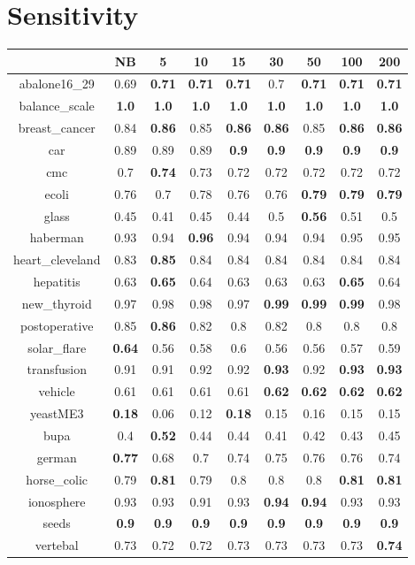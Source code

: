 \documentclass{article}%
\begin{document}
%
\section*{Sensitivity}%
\begin{tabular}{c|cccccccc}%
\hline%
&NB&5&10&15&30&50&100&200\\%
\hline%
abalone16\_29&0.69&\textbf{0.71}&\textbf{0.71}&\textbf{0.71}&0.7&\textbf{0.71}&\textbf{0.71}&\textbf{0.71}\\%
\hline%
balance\_scale&\textbf{1.0}&\textbf{1.0}&\textbf{1.0}&\textbf{1.0}&\textbf{1.0}&\textbf{1.0}&\textbf{1.0}&\textbf{1.0}\\%
\hline%
breast\_cancer&0.84&\textbf{0.86}&0.85&\textbf{0.86}&\textbf{0.86}&0.85&\textbf{0.86}&\textbf{0.86}\\%
\hline%
car&0.89&0.89&0.89&\textbf{0.9}&\textbf{0.9}&\textbf{0.9}&\textbf{0.9}&\textbf{0.9}\\%
\hline%
cmc&0.7&\textbf{0.74}&0.73&0.72&0.72&0.72&0.72&0.72\\%
\hline%
ecoli&0.76&0.7&0.78&0.76&0.76&\textbf{0.79}&\textbf{0.79}&\textbf{0.79}\\%
\hline%
glass&0.45&0.41&0.45&0.44&0.5&\textbf{0.56}&0.51&0.5\\%
\hline%
haberman&0.93&0.94&\textbf{0.96}&0.94&0.94&0.94&0.95&0.95\\%
\hline%
heart\_cleveland&0.83&\textbf{0.85}&0.84&0.84&0.84&0.84&0.84&0.84\\%
\hline%
hepatitis&0.63&\textbf{0.65}&0.64&0.63&0.63&0.63&\textbf{0.65}&0.64\\%
\hline%
new\_thyroid&0.97&0.98&0.98&0.97&\textbf{0.99}&\textbf{0.99}&\textbf{0.99}&0.98\\%
\hline%
postoperative&0.85&\textbf{0.86}&0.82&0.8&0.82&0.8&0.8&0.8\\%
\hline%
solar\_flare&\textbf{0.64}&0.56&0.58&0.6&0.56&0.56&0.57&0.59\\%
\hline%
transfusion&0.91&0.91&0.92&0.92&\textbf{0.93}&0.92&\textbf{0.93}&\textbf{0.93}\\%
\hline%
vehicle&0.61&0.61&0.61&0.61&\textbf{0.62}&\textbf{0.62}&\textbf{0.62}&\textbf{0.62}\\%
\hline%
yeastME3&\textbf{0.18}&0.06&0.12&\textbf{0.18}&0.15&0.16&0.15&0.15\\%
\hline%
bupa&0.4&\textbf{0.52}&0.44&0.44&0.41&0.42&0.43&0.45\\%
\hline%
german&\textbf{0.77}&0.68&0.7&0.74&0.75&0.76&0.76&0.74\\%
\hline%
horse\_colic&0.79&\textbf{0.81}&0.79&0.8&0.8&0.8&\textbf{0.81}&\textbf{0.81}\\%
\hline%
ionosphere&0.93&0.93&0.91&0.93&\textbf{0.94}&\textbf{0.94}&0.93&0.93\\%
\hline%
seeds&\textbf{0.9}&\textbf{0.9}&\textbf{0.9}&\textbf{0.9}&\textbf{0.9}&\textbf{0.9}&\textbf{0.9}&\textbf{0.9}\\%
\hline%
vertebal&0.73&0.72&0.72&0.73&0.73&0.73&0.73&\textbf{0.74}\\%
\hline%
\end{tabular}
\end{document}
